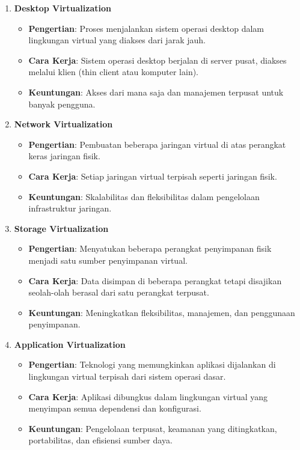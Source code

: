 \documentclass[12pt]{article}
\begin{document}
\begin{enumerate}
    \item \textbf{Desktop Virtualization}
    \begin{itemize}
        \item \textbf{Pengertian}: Proses menjalankan sistem operasi desktop dalam lingkungan virtual yang diakses dari jarak jauh.
        \item \textbf{Cara Kerja}: Sistem operasi desktop berjalan di server pusat, diakses melalui klien (thin client atau komputer lain).
        \item \textbf{Keuntungan}: Akses dari mana saja dan manajemen terpusat untuk banyak pengguna.
    \end{itemize}

    \item \textbf{Network Virtualization}
    \begin{itemize}
        \item \textbf{Pengertian}: Pembuatan beberapa jaringan virtual di atas perangkat keras jaringan fisik.
        \item \textbf{Cara Kerja}: Setiap jaringan virtual terpisah seperti jaringan fisik.
        \item \textbf{Keuntungan}: Skalabilitas dan fleksibilitas dalam pengelolaan infrastruktur jaringan.
    \end{itemize}

    \item \textbf{Storage Virtualization}
    \begin{itemize}
        \item \textbf{Pengertian}: Menyatukan beberapa perangkat penyimpanan fisik menjadi satu sumber penyimpanan virtual.
        \item \textbf{Cara Kerja}: Data disimpan di beberapa perangkat tetapi disajikan seolah-olah berasal dari satu perangkat terpusat.
        \item \textbf{Keuntungan}: Meningkatkan fleksibilitas, manajemen, dan penggunaan penyimpanan.
    \end{itemize}

    \item \textbf{Application Virtualization}
    \begin{itemize}
        \item \textbf{Pengertian}: Teknologi yang memungkinkan aplikasi dijalankan di lingkungan virtual terpisah dari sistem operasi dasar.
        \item \textbf{Cara Kerja}: Aplikasi dibungkus dalam lingkungan virtual yang menyimpan semua dependensi dan konfigurasi.
        \item \textbf{Keuntungan}: Pengelolaan terpusat, keamanan yang ditingkatkan, portabilitas, dan efisiensi sumber daya.
    \end{itemize}
\end{enumerate}
\end{document}
